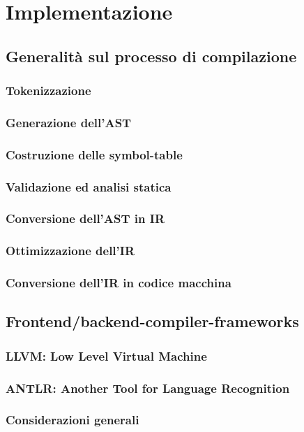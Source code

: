 \section{Implementazione}

\subsection{Generalità sul processo di compilazione}
\subsubsection{Tokenizzazione}
\subsubsection{Generazione dell'AST}
\subsubsection{Costruzione delle symbol-table}
\subsubsection{Validazione ed analisi statica}
\subsubsection{Conversione dell'AST in IR}
\subsubsection{Ottimizzazione dell'IR}
\subsubsection{Conversione dell'IR in codice macchina}

\subsection{Frontend/backend-compiler-frameworks}
\subsubsection{LLVM: Low Level Virtual Machine}
\subsubsection{ANTLR: Another Tool for Language Recognition}
\subsubsection{Considerazioni generali}

